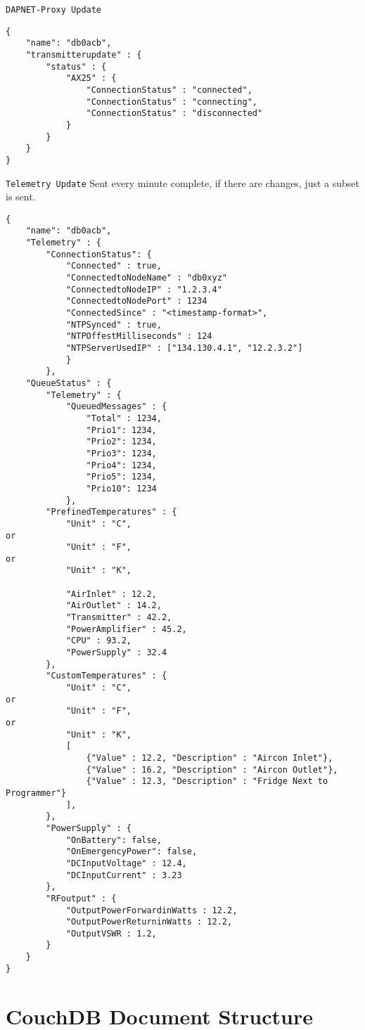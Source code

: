 \documentclass[a4paper]{article}
\begin{document}
\texttt{DAPNET-Proxy Update}
\begin{lstlisting}
{
    "name": "db0acb",
    "transmitterupdate" : {
        "status" : {
            "AX25" : {
                "ConnectionStatus" : "connected",
                "ConnectionStatus" : "connecting",
                "ConnectionStatus" : "disconnected"
            }
        }
    }
}
\end{lstlisting}

\texttt{Telemetry Update}
Sent every minute complete, if there are changes, just a subset is sent.
\begin{lstlisting}
{
    "name": "db0acb",
    "Telemetry" : {
        "ConnectionStatus": {
            "Connected" : true,
            "ConnectedtoNodeName" : "db0xyz"
            "ConnectedtoNodeIP" : "1.2.3.4"
            "ConnectedtoNodePort" : 1234
            "ConnectedSince" : "<timestamp-format>",
	    	"NTPSynced" : true,
            "NTPOffestMilliseconds" : 124
            "NTPServerUsedIP" : ["134.130.4.1", "12.2.3.2"]
            }
        },
    "QueueStatus" : {
        "Telemetry" : {
            "QueuedMessages" : {
                "Total" : 1234,
                "Prio1": 1234,
                "Prio2": 1234,
                "Prio3": 1234,
                "Prio4": 1234,
                "Prio5": 1234,
                "Prio10": 1234
            },
        "PrefinedTemperatures" : {
            "Unit" : "C",
or
            "Unit" : "F",
or
            "Unit" : "K",
         
            "AirInlet" : 12.2,
            "AirOutlet" : 14.2,
            "Transmitter" : 42.2,
            "PowerAmplifier" : 45.2,
            "CPU" : 93.2,
            "PowerSupply" : 32.4
        },
        "CustomTemperatures" : {
            "Unit" : "C",
or
            "Unit" : "F",
or
            "Unit" : "K",
            [
                {"Value" : 12.2, "Description" : "Aircon Inlet"},
                {"Value" : 16.2, "Description" : "Aircon Outlet"},
                {"Value" : 12.3, "Description" : "Fridge Next to Programmer"}
            ],
        },
        "PowerSupply" : {
            "OnBattery": false,
            "OnEmergencyPower": false,
            "DCInputVoltage" : 12.4,
            "DCInputCurrent" : 3.23
        },
        "RFoutput" : {
            "OutputPowerForwardinWatts : 12.2,
            "OutputPowerReturninWatts : 12.2,
            "OutputVSWR : 1.2,
        }
    }
}
\end{lstlisting}
\section{CouchDB Document Structure}
\end{document}
